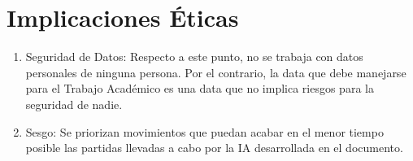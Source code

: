 \section{Implicaciones Éticas}
\begin{enumerate}
\item Seguridad de Datos: Respecto a este punto, no se trabaja con datos personales de ninguna persona. Por el contrario, la data que debe manejarse para el Trabajo Académico es una data que no implica riesgos para la seguridad de nadie.
\item Sesgo: Se priorizan movimientos que puedan acabar en el menor tiempo posible las partidas llevadas a cabo por la IA desarrollada en el documento.
\end{enumerate}
